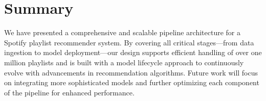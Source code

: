 \documentclass{article}
\begin{document}
\section{Summary}
We have presented a comprehensive and scalable pipeline architecture for a Spotify playlist recommender system. By covering all critical stages—from data ingestion to model deployment—our design supports efficient handling of over one million playlists and is built with a model lifecycle approach to continuously evolve with advancements in recommendation algorithms. Future work will focus on integrating more sophisticated models and further optimizing each component of the pipeline for enhanced performance.
\end{document}
